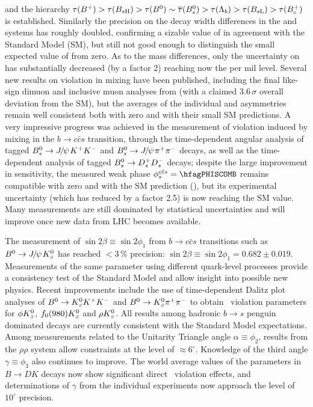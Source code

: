 and the hierarchy
$\tau(\Bu)> \tau(B_{s\rm H})> \tau(\Bd) \sim \bar{\tau}(\Bs) > \tau(\Lambda_b) > \tau(B_{s\rm L}) > \tau(\Bc)$
is established. Similarly the precision on the decay width differences in the 
\Bd and \Bs systems has roughly doubled, confirming a sizable value of \DGs in agreement with the 
Standard Model (SM), but still not good enough to distinguish the small expected value of \DGd from zero.
As to the mass differences, only the uncertainty on \dms has substantially decreased (by a factor 2) 
reaching now the per mil level. Several new results on \CP violation in mixing have been 
published, including the final like-sign dimuon and inclusive muon analyses from \dzero (with a claimed 
$3.6\,\sigma$ overall deviation from the SM), but the averages of the individual \Bd and \Bs asymmetries 
remain well consistent both with zero and with their small SM predictions. 
A very impressive progress was achieved in the measurement of
\CP violation induced by \Bs mixing in the $b\to c\bar{c}s$ transition, through the 
time-dependent angular analysis of tagged $B^0_s\to {J\mskip -3mu/\mskip -2mu\psi\mskip 2mu} K^+K^-$ and $B^0_s\to {J\mskip -3mu/\mskip -2mu\psi\mskip 2mu} \pi^+\pi^-$ decays,
as well as the time-dependent analysis of tagged  $B^0_s\to D_s^+ D_s^-$ decays; 
despite the large improvement in sensitivity, the measured weak phase
$\phiccbars = \hfagPHISCOMB$ remains compatible with zero and with the SM prediction (\hfagPHISSM), 
but its experimental uncertainty (which has reduced by a factor 2.5) is now reaching the SM value.
Many measurements are still dominated by 
statistical uncertainties and will improve once new data from LHC becomes available.

The measurement of $\sin 2\beta \equiv \sin 2\phi_1$ from $b \to
c\bar{c}s$ transitions such as $B^0 \to {J\mskip -3mu/\mskip -2mu\psi\mskip 2mu}K^0_{\scriptscriptstyle S}$ has reached $<3\,\%$
precision: $\sin 2\beta \equiv \sin 2\phi_1 = 0.682 \pm 0.019$.
Measurements of the same parameter using different quark-level processes
provide a consistency test of the Standard Model and allow insight into
possible new physics.  Recent improvements include the use of
time-dependent Dalitz plot analyses of $B^0 \to K^0_{\scriptscriptstyle S}K^+K^-$ and $B^0 \to
K^0_{\scriptscriptstyle S}\pi^+\pi^-$ to obtain \CP\ violation parameters for $\phi K^0_{\scriptscriptstyle S}$,
$f_0(980)K^0_{\scriptscriptstyle S}$ and $\rho K^0_{\scriptscriptstyle S}$.  All results among hadronic $b \to s$
penguin dominated decays are currently consistent with the Standard
Model expectations.  Among measurements related to the Unitarity
Triangle angle $\alpha \equiv \phi_2$, results from the
$\rho\rho$ system allow constraints at the level of $\approx
6^\circ$.  Knowledge of the third angle $\gamma \equiv \phi_3$ also
continues to improve.  The world average values of
the parameters in $B \to DK$ decays now show significant direct 
\CP\ violation effects, and determinations of $\gamma$ from the
individual experiments now approach the level of $10^\circ$ precision.

